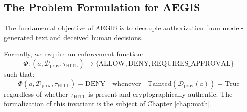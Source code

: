 \subsection{The Problem Formulation for AEGIS}
The fundamental objective of AEGIS is to decouple authorization from model-generated text and deceived human decisions. 

Formally, we require an enforcement function:
\begin{equation}
\Phi : (a, \mathcal{D}_{\text{prov}}, \tau_{\text{HITL}}) \to \{\text{ALLOW}, \text{DENY}, \text{REQUIRES\_APPROVAL}\}
\end{equation}
such that:
\begin{equation}
\Phi(a, \mathcal{D}_{\text{prov}}, \tau_{\text{HITL}}) = \text{DENY} \quad \text{whenever} \quad \text{Tainted}(\mathcal{D}_{\text{prov}}(a)) = \text{True}
\end{equation}
regardless of whether $\tau_{\text{HITL}}$ is present and cryptographically authentic. The formalization of this invariant is the subject of Chapter \ref{chap:math}.
